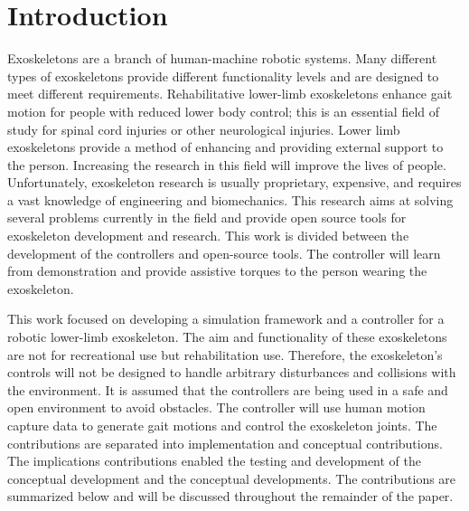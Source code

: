 \chapter{Introduction}

Exoskeletons are a branch of human-machine robotic systems. Many different types of exoskeletons provide different functionality levels and are designed to meet different requirements. Rehabilitative lower-limb exoskeletons enhance gait motion for people with reduced lower body control; this is an essential field of study for spinal cord injuries or other neurological injuries. Lower limb exoskeletons provide a method of enhancing and providing external support to the person. Increasing the research in this field will improve the lives of people. Unfortunately, exoskeleton research is usually proprietary, expensive, and requires a vast knowledge of engineering and biomechanics. This research aims at solving several problems currently in the field and provide open source tools for exoskeleton development and research. This work is divided between the development of the controllers and open-source tools. The controller will learn from demonstration and provide assistive torques to the person wearing the exoskeleton.


This work focused on developing a simulation framework and a controller for a robotic lower-limb exoskeleton. The aim and functionality of these exoskeletons are not for recreational use but rehabilitation use. Therefore, the exoskeleton's controls will not be designed to handle arbitrary disturbances and collisions with the environment. It is assumed that the controllers are being used in a safe and open environment to avoid obstacles. The controller will use human motion capture data to generate gait motions and control the exoskeleton joints. The contributions are separated into implementation and conceptual contributions. The implications contributions enabled the testing and development of the conceptual development and the conceptual developments. The contributions are summarized below and will be discussed throughout the remainder of the paper. 


